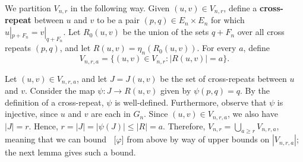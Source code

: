 \documentclass[12pt]{amsart}
\theoremstyle{definition}
\DeclareMathOperator{\Var}{Var_{n,\alpha}}
\begin{document}
We partition $V_{n,r}$ in the following way. Given $(u,v) \in V_{n,r}$, define a \textbf{cross-repeat} between $u$ and $v$ to be a pair 
$(p,q) \in E_n \times E_n$ for which $u|_{p+F_n} = v|_{q+F_n}$. Let $R_0(u,v)$ be the union of the sets $q+F_n$ over all cross repeats $(p,q)$, and let $R(u,v) = \eta_n(R_0(u,v))$. For every $a$, define
\begin{equation*}
V_{n,r,a} = \bigl\{ (u,v) \in V_{n,r} : |R(u,v)| = a \bigr\}.
\end{equation*}

Let $(u,v) \in V_{n,r,a}$, and let $J = J(u,v)$ be the set of cross-repeats between $u$ and $v$.
Consider the map $\psi : J \to R(u,v)$ given by $\psi(p,q) = q$. By the definition of a cross-repeat, $\psi$ is well-defined. Furthermore, observe that $\psi$ is injective, since $u$ and $v$ are each in $G_n$. Since $(u,v) \in V_{n,r,a}$, we also have $|J| = r$. Hence, $r = |J| = |\psi(J)| \leq |R| = a$. Therefore, $V_{n,r} = \bigcup_{a \geq r} V_{n,r,a}$, meaning that we can bound $\Var \bigl[ \varphi \bigr]$ from above by way of upper bounds on $|V_{n,r,a}|$; the next lemma gives such a bound.
\end{document}
